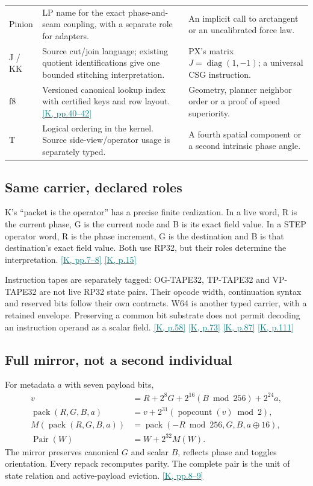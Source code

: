 \documentclass[11pt,a4paper]{article}
\newcommand{\kref}[1]{\hyperlink{baseline.#1}{\textcolor{teal}{[K, p.#1]}}}
\newcommand{\krange}[2]{\hyperlink{baseline.#1}{\textcolor{teal}{[K, pp.#1--#2]}}}
\theoremstyle{lpstyle}
\begin{document}
\begin{longtable}{L{28mm}L{53mm}L{72mm}}
Pinion&LP name for the exact phase-and-seam coupling, with a separate role for adapters.&An implicit call to arctangent or an uncalibrated force law.\\
J / KK&Source cut/join language; existing quotient identifications give one bounded stitching interpretation.&PX's matrix $J=\operatorname{diag}(1,-1)$; a universal CSG instruction.\\
f8&Versioned canonical lookup index with certified keys and row layout. \krange{40}{42}&Geometry, planner neighbor order or a proof of speed superiority.\\
T&Logical ordering in the kernel. Source side-view/operator usage is separately typed.&A fourth spatial component or a second intrinsic phase angle.\\
\bottomrule
\end{longtable}

\subsection{Same carrier, declared roles}
K's ``packet is the operator'' has a precise finite realization. In a live word, R is the current phase, G is the current node and B is its exact field value. In a STEP operator word, R is the phase increment, G is the destination and B is that destination's exact field value. Both use RP32, but their roles determine the interpretation. \krange{7}{8} \kref{15}

Instruction tapes are separately tagged: OG-TAPE32, TP-TAPE32 and VP-TAPE32 are not live RP32 state pairs. Their opcode width, continuation syntax and reserved bits follow their own contracts. W64 is another typed carrier, with a retained envelope. Preserving a common bit substrate does not permit decoding an instruction operand as a scalar field. \kref{58} \kref{73} \kref{87} \kref{111}

\subsection{Full mirror, not a second individual}
For metadata $a$ with seven payload bits,
\begin{align*}
v&=R+2^8G+2^{16}(B\bmod256)+2^{24}a,\\
\operatorname{pack}(R,G,B,a)&=v+2^{31}(\operatorname{popcount}(v)\bmod2),\\
M(\operatorname{pack}(R,G,B,a))&=\operatorname{pack}(-R\bmod256,G,B,a\oplus16),\\
\operatorname{Pair}(W)&=W+2^{32}M(W).
\end{align*}
The mirror preserves canonical $G$ and scalar $B$, reflects phase and toggles orientation. Every repack recomputes parity. The complete pair is the unit of state relation and active-payload eviction. \krange{8}{9}
\end{document}
